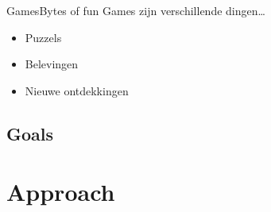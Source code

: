 \documentclass{beamer}
\begin{document}
\begin{frame}{Games}{Bytes of fun}
	Games zijn verschillende dingen\dots
	\pause
	\begin{itemize}
		\item
			Puzzels
			\pause
		\item
			Belevingen
			\pause
		\item
			Nieuwe ontdekkingen
	\end{itemize}
\end{frame}

\subsection{Goals}


\section{Approach}

\end{document}
